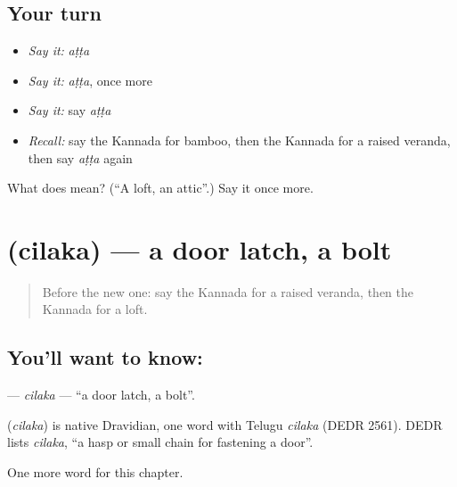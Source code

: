 \subsection*{Your turn}
\begin{itemize}
\raggedright
  \item \emph{Say it:} \emph{aṭṭa}
  \item \emph{Say it:} \emph{aṭṭa}, once more
  \item \emph{Say it:} say \emph{aṭṭa}
  \item \emph{Recall:} say the Kannada for bamboo, then the Kannada for a raised veranda, then say \emph{aṭṭa} again
\end{itemize}

\begin{tcolorbox}[breakable,colback=teal!4,colframe=teal!35!black,title={Before you move on}]
What does  mean? (\textquotedblleft{}A loft, an attic\textquotedblright{}.) Say it once more.
\end{tcolorbox}
\section[\texorpdfstring{\kn{ಚಿಲಕ} (cilaka)}{ಚಿಲಕ (cilaka)}]{ (cilaka) — a door latch, a bolt}

\label{lesson:KA-C303-cilaka}



\begin{quote}
Before the new one: say the Kannada for a raised veranda, then the Kannada for a loft.
\end{quote}

\subsection*{You'll want to know: }
\textbf{} — \emph{cilaka} — \textquotedblleft{}a door latch, a bolt\textquotedblright{}.

\begin{cousinweb}
\textbf{} (\emph{cilaka}) is native Dravidian, one word with Telugu \emph{cilaka} (DEDR 2561). DEDR lists \emph{cilaka}, \textquotedblleft{}a hasp or small chain for fastening a door\textquotedblright{}.
\end{cousinweb}

\begin{grammarlens}[title={What you've built}]
One more word for this chapter.
\end{grammarlens}

